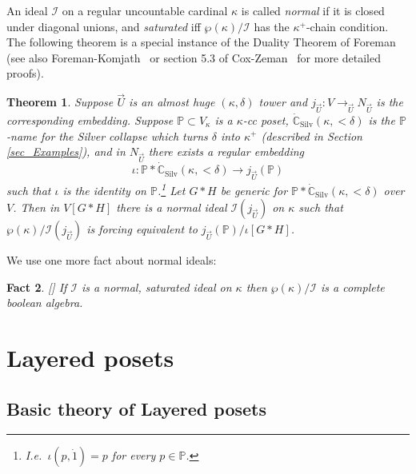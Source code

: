 \documentclass{amsart}
\newtheorem{theorem}{Theorem}
\newtheorem{fact}[theorem]{Fact}
\begin{document}
An ideal $\mathcal{I}$ on a regular uncountable cardinal $\kappa$ is called \emph{normal} if it is closed under diagonal unions, and \emph{saturated} iff $\wp(\kappa)/\mathcal{I}$ has the $\kappa^+$-chain condition.  The following theorem is a special instance of the Duality Theorem of Foreman~\cite{MattHandbook} (see also Foreman-Komjath~\cite{MR2151585} or section 5.3 of Cox-Zeman~\cite{Cox_MALP} for more detailed proofs).   
\begin{theorem}\label{thm_Duality_AH}
Suppose $\vec{U}$ is an almost huge $(\kappa,\delta)$ tower and $j_{\vec{U}}: V \to_{\vec{U}} N_{\vec{U}}$ is the corresponding embedding.  Suppose $\mathbb{P} \subset V_\kappa$ is a $\kappa$-cc poset, $\dot{\mathbb{C}}_{\text{Silv}}(\kappa, < \delta)$ is the $\mathbb{P}$-name for the Silver collapse which turns $\delta$ into $\kappa^+$ (described in Section \ref{sec_Examples}), and in $N_{\vec{U}}$ there exists a regular embedding
\[
\iota: \mathbb{P}*\dot{\mathbb{C}}_{\text{Silv}}(\kappa, < \delta) \to j_{\vec{U}}(\mathbb{P})
\]
such that $\iota$ is the identity on $\mathbb{P}$.\footnote{I.e.\ $\iota(p,\dot{1}) = p$ for every $p \in \mathbb{P}$.}  Let $G*H$ be generic for $\mathbb{P}*\dot{\mathbb{C}}_{\text{Silv}}(\kappa, < \delta)$ over $V$.  Then in $V[G*H]$ there is a normal ideal $\mathcal{I}(j_{\vec{U}})$ on $\kappa$ such that $\wp(\kappa)/\mathcal{I}(j_{\vec{U}})$ is forcing equivalent to $j_{\vec{U}}(\mathbb{P})/\iota[G*H]$. 
\end{theorem}

We use one more fact about normal ideals:
\begin{fact}\label{fact_SaturatedImpliesCompleteBA}[\cite{MattHandbook}]
If $\mathcal{I}$ is a normal, saturated ideal on $\kappa$ then $\wp(\kappa)/\mathcal{I}$ is a complete boolean algebra. 
\end{fact}



\section{Layered posets}\label{sec_LayeredPosets}

\subsection{Basic theory of Layered posets}
\end{document}
